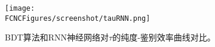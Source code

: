 \begin{figure}[H]
\centering
\texttt{[image: \\FCNCFigures/screenshot/tauRNN.png]}
\caption{BDT算法和RNN神经网络对$\tau$的纯度-鉴别效率曲线对比。}
\label{fig:tauRNN}
\end{figure}